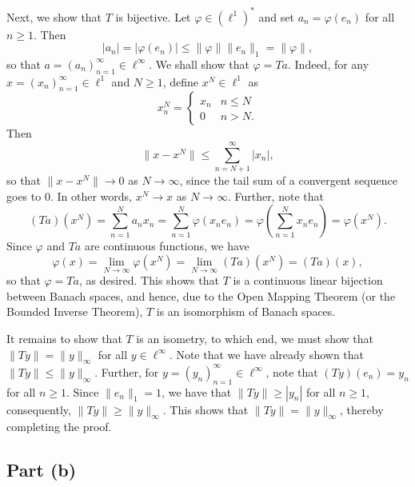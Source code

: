 \documentclass[11pt]{article}
\theoremstyle{thmstyle}
\theoremstyle{defstyle}
\renewcommand{\le}{\leqslant}
\renewcommand{\ge}{\geqslant}
\begin{document}
Next, we show that $T$ is bijective. Let $\varphi\in\left(\ell^1\right)^\ast$ and set $a_n = \varphi(e_n)$ for all $n\ge 1$. Then 
\begin{equation*}
    |a_n| = |\varphi(e_n)|\le\|\varphi\|\|e_n\|_1 = \|\varphi\|,
\end{equation*}
so that $a = (a_n)_{n = 1}^\infty\in\ell^\infty$. We shall show that $\varphi = Ta$. Indeed, for any $x = (x_n)_{n = 1}^\infty\in\ell^1$ and $N\ge 1$, define $x^N\in\ell^1$ as 
\begin{equation*}
    x^N_n = \begin{cases}
        x_n & n\le N\\
        0 & n > N.
    \end{cases}
\end{equation*}
Then 
\begin{equation*}
    \|x - x^N\|\le\sum_{n = N + 1}^\infty |x_n|,
\end{equation*}
so that $\|x - x^N\|\to 0$ as $N\to\infty$, since the tail sum of a convergent sequence goes to $0$. In other words, $x^N\to x$ as $N\to\infty$. Further, note that 
\begin{equation*}
    (Ta)(x^N) = \sum_{n = 1}^N a_n x_n = \sum_{n = 1}^N \varphi(x_n e_n) = \varphi\left(\sum_{n = 1}^N x_n e_n\right) = \varphi(x^N).
\end{equation*}
Since $\varphi$ and $Ta$ are continuous functions, we have 
\begin{equation*}
    \varphi(x) = \lim_{N\to\infty} \varphi(x^N) = \lim_{N\to\infty} (Ta)(x^N) = (Ta)(x),
\end{equation*}
so that $\varphi = Ta$, as desired. This shows that $T$ is a continuous linear bijection between Banach spaces, and hence, due to the Open Mapping Theorem (or the Bounded Inverse Theorem), $T$ is an isomorphism of Banach spaces.

It remains to show that $T$ is an isometry, to which end, we must show that $\|Ty\| = \|y\|_\infty$ for all $y\in\ell^\infty$. Note that we have already shown that $\|Ty\|\le\|y\|_\infty$. Further, for $y = (y_n)_{n = 1}^\infty\in\ell^\infty$, note that $(Ty)(e_n) = y_n$ for all $n\ge 1$. Since $\|e_n\|_1 = 1$, we have that $\|Ty\|\ge |y_n|$ for all $n\ge 1$, consequently, $\|Ty\|\ge \|y\|_\infty$. This shows that $\|Ty\| = \|y\|_\infty$, thereby completing the proof.

\subsection{Part (b)}
\end{document}
